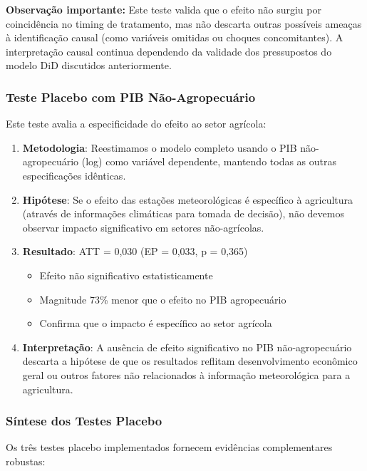 \documentclass[
	12pt,				%
	oneside,			%
	a4paper,			%
	english,			%
	french,				%
	spanish,			%
	brazil				%
	]{abntex2}
\begin{document}
\textbf{Observação importante:} Este teste valida que o efeito não surgiu por coincidência no timing de tratamento, mas não descarta outras possíveis ameaças à identificação causal (como variáveis omitidas ou choques concomitantes). A interpretação causal continua dependendo da validade dos pressupostos do modelo DiD discutidos anteriormente.

\subsubsection{Teste Placebo com PIB Não-Agropecuário}

Este teste avalia a especificidade do efeito ao setor agrícola:

\begin{enumerate}
\item \textbf{Metodologia}: Reestimamos o modelo completo usando o PIB não-agropecuário (log) como variável dependente, mantendo todas as outras especificações idênticas.

\item \textbf{Hipótese}: Se o efeito das estações meteorológicas é específico à agricultura (através de informações climáticas para tomada de decisão), não devemos observar impacto significativo em setores não-agrícolas.

\item \textbf{Resultado}: ATT = 0,030 (EP = 0,033, p = 0,365)
\begin{itemize}
\item Efeito não significativo estatisticamente
\item Magnitude 73\% menor que o efeito no PIB agropecuário
\item Confirma que o impacto é específico ao setor agrícola
\end{itemize}

\item \textbf{Interpretação}: A ausência de efeito significativo no PIB não-agropecuário descarta a hipótese de que os resultados reflitam desenvolvimento econômico geral ou outros fatores não relacionados à informação meteorológica para a agricultura.
\end{enumerate}

\subsubsection{Síntese dos Testes Placebo}

Os três testes placebo implementados fornecem evidências complementares robustas:
\end{document}
